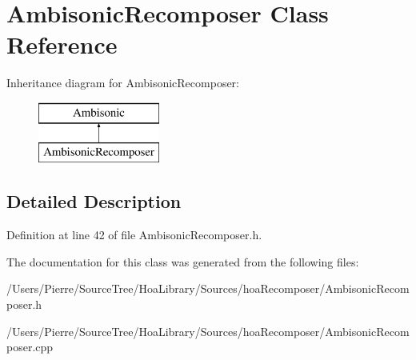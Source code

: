 \hypertarget{class_ambisonic_recomposer}{\section{Ambisonic\-Recomposer Class Reference}
\label{class_ambisonic_recomposer}
}
Inheritance diagram for Ambisonic\-Recomposer\-:\begin{figure}[H]
\begin{center}
\leavevmode
\includegraphics[height=2.000000cm]{class_ambisonic_recomposer}
\end{center}
\end{figure}


\subsection{Detailed Description}


Definition at line 42 of file Ambisonic\-Recomposer.\-h.



The documentation for this class was generated from the following files\-:\begin{DoxyCompactItemize}
\item 
/\-Users/\-Pierre/\-Source\-Tree/\-Hoa\-Library/\-Sources/hoa\-Recomposer/Ambisonic\-Recomposer.\-h\item 
/\-Users/\-Pierre/\-Source\-Tree/\-Hoa\-Library/\-Sources/hoa\-Recomposer/Ambisonic\-Recomposer.\-cpp\end{DoxyCompactItemize}
